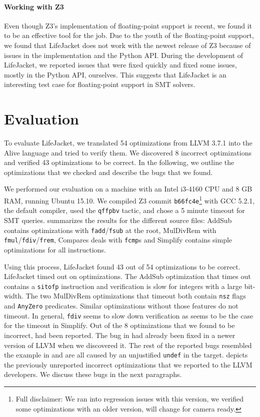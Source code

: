 \documentclass[preprint, numbers]{sigplanconf}
\newcommand{\xxx}{LifeJacket}
\newcommand{\numtranslated}{54}
\newcommand{\numverified}{43}
\newcommand{\numbugs}{8}
\newcommand{\numnewbugs}{3}
\newcommand{\numtimeouts}{4}
\newcommand{\numreported}{4}
\begin{document}
\paragraph{Working with Z3} Even though Z3's implementation of floating-point
support is recent, we found it to be an effective tool for the job. Due to the
youth of the floating-point support, we found that  \xxx{} does not work with
the newest release of Z3 because of issues in the implementation and the Python
API. During the development of \xxx{}, we reported issues that were fixed
quickly and fixed some issues, mostly in the Python API, ourselves. This
suggests that \xxx{} is an interesting test case for floating-point support in
SMT solvers.

\section{Evaluation} \label{sec:evaluation}

To evaluate \xxx{}, we translated \numtranslated{} optimizations from LLVM
3.7.1 into the Alive language and tried to verify them. We discovered
\numbugs{} incorrect optimizations and verified \numverified{} optimizations to
be correct. In the following, we outline the optimizations that we checked and
describe the bugs that we found.

We performed our evaluation on a machine with an Intel i3-4160 CPU and 8 GB
RAM, running Ubuntu 15.10. We compiled Z3 commit \texttt{b66fc4e}\footnote{Full
disclaimer: We ran into regression issues with this version, we verified some
optimizations with an older version, will change for camera ready.} with GCC
5.2.1, the default compiler, used the \texttt{qffpbv} tactic, and chose a 5
minute timeout for SMT queries.  summarizes the results for the
different source files: AddSub contains optimizations with
\texttt{fadd}/\texttt{fsub} at the root, MulDivRem with
\texttt{fmul}/\texttt{fdiv}/\texttt{frem}, Compares deals with \texttt{fcmp}s
and Simplify contains simple optimizations for all instructions.

Using this process, \xxx{} found \numverified{} out of \numtranslated{}
optimizations to be correct. \xxx{} timed out on \numberstringnum{\numtimeouts}
optimizations. The AddSub optimization that times out contains a
\texttt{sitofp} instruction and verification is slow for integers with a large
bit-width. The two MulDivRem optimizations that timeout both contain
\texttt{nsz} flags and \texttt{AnyZero} predicates. Similar optimizations
without those features do not timeout. In general, \texttt{fdiv} seems to slow
down verification as seems to be the case for the timeout in Simplify. Out of
the \numbugs{} optimizations that we found to be incorrect,
\numberstringnum{\numreported} had been reported.  The bug in 
had already been fixed in a newer version of LLVM when we discovered it.  The
rest of the reported bugs resembled the example in  and are all
caused by an unjustified \texttt{undef} in the target.  depicts
the \numberstringnum{\numnewbugs} previously unreported incorrect optimizations
that we reported to the LLVM developers.  We discuss these bugs in the next
paragraphs.
\end{document}
